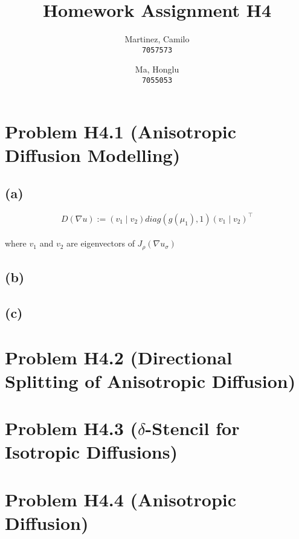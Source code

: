 \documentclass[11pt]{article}
\title{Homework Assignment H4}
\author{Martinez, Camilo\\
	\texttt{7057573}
	\and
	Ma, Honglu\\
	\texttt{7055053}}
\begin{document}
\maketitle

\section*{Problem H4.1 (Anisotropic Diffusion Modelling)}
\subsection*{(a)}
$$D(\nabla u) :=  (v_1 \mid v_2) diag(g(\mu_1), 1) (v_1\mid v_2)^\top$$\\ where $v_1$ and $v_2$ are eigenvectors of $J_\rho(\nabla u_\sigma)$
\subsection*{(b)}
\subsection*{(c)}

\section*{Problem H4.2 (Directional Splitting of Anisotropic Diffusion)}

\section*{Problem H4.3 ($\delta$-Stencil for Isotropic Diffusions)}
\section*{Problem H4.4 (Anisotropic Diffusion)}
\end{document}
